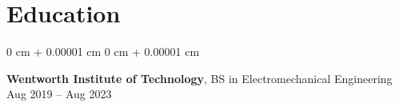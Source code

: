 \documentclass[10pt, letterpaper]{article}
\newenvironment{highlightsforbulletentries}{
    \begin{itemize}[
        topsep=0.10 cm,
        parsep=0.10 cm,
        partopsep=0pt,
        itemsep=0pt,
        leftmargin=10pt
    ]
}{
    \end{itemize}
} %
\newenvironment{onecolentry}{
    \begin{adjustwidth}{
        0 cm + 0.00001 cm
    }{
        0 cm + 0.00001 cm
    }
}{
    \end{adjustwidth}
} %
\newenvironment{twocolentry}[2][]{
    \onecolentry
    \def\secondColumn{#2}
    \setcolumnwidth{\fill, 4.5 cm}
    \begin{paracol}{2}
}{
    \switchcolumn \raggedleft \secondColumn
    \end{paracol}
    \endonecolentry
} %
\begin{document}
%
%
%
%
%    
%
%
%
%
%
%
%
%
%
    \section{Education}
        \begin{twocolentry}{
            Aug 2019 – Aug 2023
        }
            \textbf{Wentworth Institute of Technology}, BS in Electromechanical Engineering\end{twocolentry}
\end{document}
